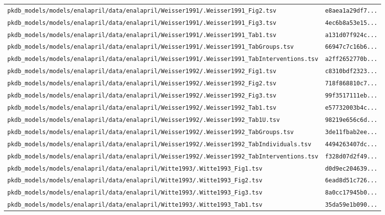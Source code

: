 \begin{longtable}{ll}
\texttt{pkdb\_models/models/enalapril/data/enalapril/Weisser1991/.Weisser1991\_Fig2.tsv} & \texttt{e8aea1a29df7...} \\
\texttt{pkdb\_models/models/enalapril/data/enalapril/Weisser1991/.Weisser1991\_Fig3.tsv} & \texttt{4ec6b8a53e15...} \\
\texttt{pkdb\_models/models/enalapril/data/enalapril/Weisser1991/.Weisser1991\_Tab1.tsv} & \texttt{a131d07f924c...} \\
\texttt{pkdb\_models/models/enalapril/data/enalapril/Weisser1991/.Weisser1991\_TabGroups.tsv} & \texttt{66947c7c16b6...} \\
\texttt{pkdb\_models/models/enalapril/data/enalapril/Weisser1991/.Weisser1991\_TabInterventions.tsv} & \texttt{a2ff2652770b...} \\
\texttt{pkdb\_models/models/enalapril/data/enalapril/Weisser1992/.Weisser1992\_Fig1.tsv} & \texttt{c8310bdf2323...} \\
\texttt{pkdb\_models/models/enalapril/data/enalapril/Weisser1992/.Weisser1992\_Fig2.tsv} & \texttt{718f868810c7...} \\
\texttt{pkdb\_models/models/enalapril/data/enalapril/Weisser1992/.Weisser1992\_Fig3.tsv} & \texttt{99f3517111eb...} \\
\texttt{pkdb\_models/models/enalapril/data/enalapril/Weisser1992/.Weisser1992\_Tab1.tsv} & \texttt{e57732003b4c...} \\
\texttt{pkdb\_models/models/enalapril/data/enalapril/Weisser1992/.Weisser1992\_Tab1U.tsv} & \texttt{98219e656c6d...} \\
\texttt{pkdb\_models/models/enalapril/data/enalapril/Weisser1992/.Weisser1992\_TabGroups.tsv} & \texttt{3de11fbab2ee...} \\
\texttt{pkdb\_models/models/enalapril/data/enalapril/Weisser1992/.Weisser1992\_TabIndividuals.tsv} & \texttt{4494263407dc...} \\
\texttt{pkdb\_models/models/enalapril/data/enalapril/Weisser1992/.Weisser1992\_TabInterventions.tsv} & \texttt{f328d07d2f49...} \\
\texttt{pkdb\_models/models/enalapril/data/enalapril/Witte1993/.Witte1993\_Fig1.tsv} & \texttt{d0d9ec204639...} \\
\texttt{pkdb\_models/models/enalapril/data/enalapril/Witte1993/.Witte1993\_Fig2.tsv} & \texttt{6ead8d51c726...} \\
\texttt{pkdb\_models/models/enalapril/data/enalapril/Witte1993/.Witte1993\_Fig3.tsv} & \texttt{8a0cc17945b0...} \\
\texttt{pkdb\_models/models/enalapril/data/enalapril/Witte1993/.Witte1993\_Tab1.tsv} & \texttt{35da59e1b090...} \\

\end{longtable}
